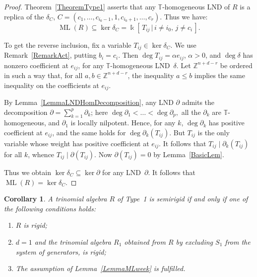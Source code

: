 \documentclass[a4paper,reqno,12pt]{amsart}
\theoremstyle{plain}
\newtheorem{corollary}[theorem]{Corollary}
\theoremstyle{definition}
\theoremstyle{plain}
\theoremstyle{remark}
\DeclareMathOperator{\ML}{ML}
\newcommand{\TT}{\mathbb{T}}
\newcommand{\kk}{\Bbbk}
\begin{document}
\begin{proof}
      Theorem~\ref{TheoremType1} asserts that any ${\TT}$-homogeneous LND of $R$ is a replica of the $\delta_C$, $C=(c_1,\ldots,c_{i_0-1},1,c_{i_0+1},\ldots, c_r)$. Thus we have: $$     \ML (R)\subseteq\ker\delta_C=\kk[\,T_{ij}\,|\,i\neq i_0, \,j\neq c_i\,].
     $$
     
     To get the reverse inclusion, fix a variable $T_{ij}\in\ker\delta_C$. We use Remark~\ref{RemarkAct}, putting $b_i=c_i$. Then $\deg T_{ij}=\alpha e_{ij}$, $\alpha>0$, and $\deg\delta$ has nonzero coefficient at $e_{ij}$, for any ${\TT}$-homogeneous LND~$\delta$. Let $\mathbb Z^{n+d-r}$ be ordered in such a way that, for all $a,b\in\mathbb Z^{n+d-r}$, the inequality $a\le b$ implies the same inequality on the coefficients at $e_{ij}$. 
     
     By Lemma~\ref{LemmaLNDHomDecomposition}, any LND $\partial$ admits the decomposition
    $
    \partial=\sum_{k=1}^p\partial_k$; here $\deg\partial_1<\ldots<\deg\partial_p,
    $
    all the $\partial_k$ are ${\TT}$-homogeneous, and $\partial_1$ is locally nilpotent. %
    Hence, for any $k$, $\deg\partial_k$ has positive coefficient at $e_{ij}$, and the same holds for $\deg\partial_k(T_{ij})$. But $T_{ij}$ is the only variable whose weight has positive coefficient at $e_{ij}$. It follows that $T_{ij}\mid\partial_k(T_{ij})$ for all $k$, whence $T_{ij}\mid\partial(T_{ij})$. Now $\partial(T_{ij})=0$ by Lemma~\ref{BasicLem}. 
    
    Thus we obtain $\ker\delta_C\subseteq\ker\partial$ for any LND~$\partial$. It follows that $\ML(R)=\ker\delta_C$.
\end{proof}
\begin{corollary}\label{CorSemiRidigType1}
    A trinomial algebra $R$ of Type~1 is semirigid if and only if one of the following conditions holds:
    \begin{enumerate}
        \item[$(a)$] $R$ is rigid;
        \item[$(b)$] $d=1$ and the trinomial algebra $R_1$ obtained from $R$ by excluding $S_1$ from the system of generators, is rigid;
        \item[$(c)$] The assumption of Lemma~\emph{\ref{LemmaMLweek}} is fulfilled.      
    \end{enumerate}
\end{corollary}
\end{document}
